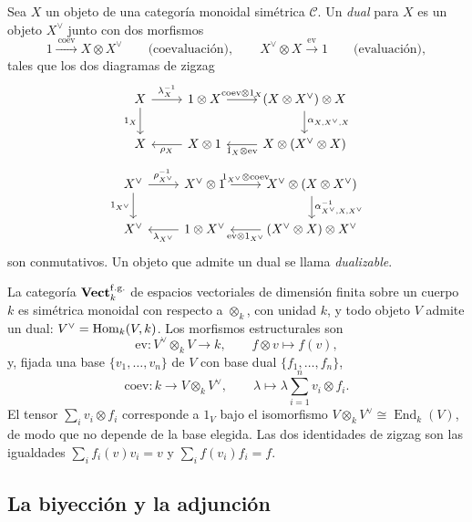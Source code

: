 \begin{defi}\label{defi:dual}
Sea $X$ un objeto de una categoría monoidal simétrica $\mathcal C$. Un \emph{dual} para $X$ es un objeto $X^\vee$ junto con dos morfismos
\[
1\xrightarrow{\ \mathrm{coev}\ }X\otimes X^\vee
\qquad\text{(coevaluación)},
\qquad
X^\vee\otimes X\xrightarrow{\ \mathrm{ev}\ }1
\qquad\text{(evaluación)},
\]
tales que los dos diagramas de zigzag
\[
\begin{tikzcd}%
X \arrow[r,"\lambda_X^{-1}"] \arrow[d,"1_X"'] & 1\otimes X \arrow[r,"\mathrm{coev}\otimes1_X"] & (X\otimes X^\vee)\otimes X \arrow[d,"\alpha_{X,X^\vee,X}"]\\
X & X\otimes1 \arrow[l,"\rho_X"] & X\otimes(X^\vee\otimes X) \arrow[l,"1_X\otimes\mathrm{ev}"]
\end{tikzcd}
\]
\[
\begin{tikzcd}%
X^\vee \arrow[r,"\rho_{X^\vee}^{-1}"] \arrow[d,"1_{X^\vee}"'] & X^\vee\otimes1 \arrow[r,"1_{X^\vee}\otimes\mathrm{coev}"] & X^\vee\otimes(X\otimes X^\vee) \arrow[d,"\alpha^{-1}_{X^\vee,X,X^\vee}"]\\
X^\vee & 1\otimes X^\vee \arrow[l,"\lambda_{X^\vee}"] & (X^\vee\otimes X)\otimes X^\vee \arrow[l,"\mathrm{ev}\otimes1_{X^\vee}"]
\end{tikzcd}
\]
son conmutativos. Un objeto que admite un dual se llama \emph{dualizable}.
\end{defi}

\begin{ejem}\label{ejem:vect}
La categoría $\mathbf{Vect}_k^{\mathrm{f.g.}}$ de espacios vectoriales de dimensión finita sobre un cuerpo $k$ es simétrica monoidal con respecto a $\otimes_k$, con unidad $k$, y todo objeto $V$ admite un dual: $V^\vee=\operatorname{Hom}_k(V,k)$. Los morfismos estructurales son
\[
\mathrm{ev}\colon V^\vee\otimes_k V\longrightarrow k,
\qquad
f\otimes v\longmapsto f(v),
\]
y, fijada una base $\{v_1,\dots,v_n\}$ de $V$ con base dual $\{f_1,\dots,f_n\}$,
\[
\mathrm{coev}\colon k\longrightarrow V\otimes_k V^\vee,
\qquad
\lambda\longmapsto\lambda\sum_{i=1}^{n}v_i\otimes f_i .
\]
El tensor $\sum_i v_i\otimes f_i$ corresponde a $1_V$ bajo el isomorfismo $V\otimes_k V^\vee\cong\operatorname{End}_k(V)$, de modo que no depende de la base elegida. Las dos identidades de zigzag son las igualdades $\sum_i f_i(v)v_i=v$ y $\sum_i f(v_i)f_i=f$.
\end{ejem}

\subsection{La biyección y la adjunción}

